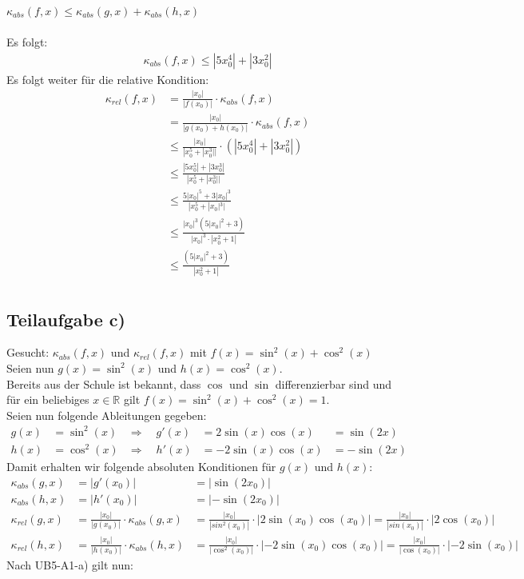 \documentclass{llncs}
\begin{document}
$\kappa_{abs}(f,x)\le \kappa_{abs}(g,x) + \kappa_{abs}(h,x) $\\\\
Es folgt:\\
\begin{align*}
\kappa_{abs}(f,x)\le |5x_0^4| + |3x_0^2|
\end{align*}
Es folgt weiter für die relative Kondition:
\begin{align*}
\kappa_{rel}(f,x) &= \frac{|x_0|}{|f(x_0)|}\cdot\kappa_{abs}(f,x)\\ 
&= \frac{|x_0|}{|g(x_0)+h(x_0)|}\cdot\kappa_{abs}(f,x)\\
&\le  \frac{|x_0|}{|x_0^5+|x_0^3||}\cdot (|5x_0^4| + |3x_0^2|)\\
&\le  \frac{|5x_0^5| + |3x_0^3|}{|x_0^5+|x_0^3||}\\
&\le  \frac{5|x_0|^5 + 3|x_0|^3}{|x_0^5+|x_0|^3|}\\
&\le  \frac{|x_0|^3(5|x_0|^2 + 3)}{|x_0|^3\cdot|x_0^2+1|}\\
&\le  \frac{(5|x_0|^2 + 3)}{|x_0^2+1|}\\
\end{align*}  
\subsection*{Teilaufgabe c)}
Gesucht: $\kappa_{abs}(f,x)$ und $\kappa_{rel}(f,x)$ mit $f(x)= \sin^2(x) + \cos^2(x)$\\
Seien nun $g(x)=\sin^2(x)$ und $h(x)=\cos^2(x)$.\\
Bereits aus der Schule ist bekannt, dass $\cos$ und $\sin$ differenzierbar sind und für ein beliebiges $x \in \mathbb{R}$ gilt $f(x)= \sin^2(x) + \cos^2(x)=1$.\\
Seien nun folgende Ableitungen gegeben:
\begin{align*}
g(x)&=\sin^2(x)  &\Rightarrow \quad g'(x)&= 2\sin(x)\cos(x) &=\sin(2x)\\
h(x)&=\cos^2(x)  &\Rightarrow \quad h'(x)&= -2\sin(x)\cos(x) &=-\sin(2x)
\end{align*}
Damit erhalten wir folgende absoluten Konditionen für $g(x)$ und $h(x)$:\\
\begin{align*}
\kappa_{abs}(g,x) &=|g'(x_0)| &= |\sin(2x_0)| \\
\kappa_{abs}(h,x) &=|h'(x_0)| &= |-\sin(2x_0)| \\
\kappa_{rel}(g,x) &= \frac{|x_0|}{|g(x_0)|}\cdot\kappa_{abs}(g,x)  &= \frac{|x_0|}{|sin^2(x_0)|}\cdot|2\sin(x_0)\cos(x_0)| = \frac{|x_0|}{|sin(x_0)|}\cdot|2\cos(x_0)|\\
\kappa_{rel}(h,x) &=\frac{|x_0|}{|h(x_0)|}\cdot\kappa_{abs}(h,x)  &= \frac{|x_0|}{|\cos^2(x_0)|}\cdot|-2\sin(x_0)\cos(x_0)| = \frac{|x_0|}{|\cos(x_0)|}\cdot|-2\sin(x_0)|
\end{align*}
Nach UB5-A1-a) gilt nun: 
\end{document}
